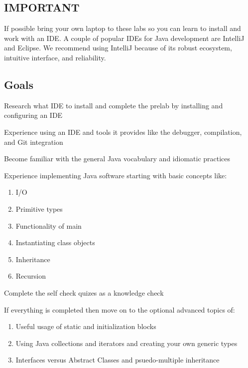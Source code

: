 \documentclass[../../main.tex]{subfiles}
\begin{document}
\subsection{IMPORTANT}
If possible bring your own laptop to these labs so you can learn to install and work with an IDE.
A couple of popular IDEs for Java development are IntelliJ and Eclipse. We recommend using
IntelliJ because of its robust ecosystem, intuitive interface, and reliability.

\subsection{Goals}

\begin{steps}
   \item Research what IDE to install and complete the prelab by installing and configuring an IDE
   \item Experience using an IDE and tools it provides like the debugger, compilation, and Git
      integration
   \item Become familiar with the general Java vocabulary and idiomatic practices
   \item Experience implementing Java software starting with basic concepts like:
   \begin{enumerate}[label=\Alph*.]
         \item I/O
         \item Primitive types
         \item Functionality of main
         \item Instantiating class objects
         \item Inheritance
         \item Recursion
      \end{enumerate}
   \item Complete the self check quizes as a knowledge check
   \item If everything is completed then move on to the optional advanced topics of:
   \begin{enumerate}[label=\Alph*.]
         \item Useful usage of static and initialization blocks
         \item Using Java collections and iterators and creating your own generic types
         \item Interfaces versus Abstract Classes and psuedo-multiple inheritance
      \end{enumerate}
\end{steps}
\end{document}
